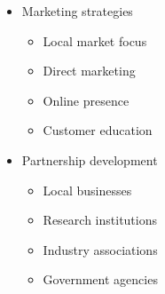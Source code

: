 \begin{itemize}
\begin{itemize}
        \item Marketing strategies
        \begin{itemize}
            \item Local market focus
            \item Direct marketing
            \item Online presence
            \item Customer education
        \end{itemize}
        
        \item Partnership development
        \begin{itemize}
            \item Local businesses
            \item Research institutions
            \item Industry associations
            \item Government agencies
        \end{itemize}
    \end{itemize}
\end{itemize}

